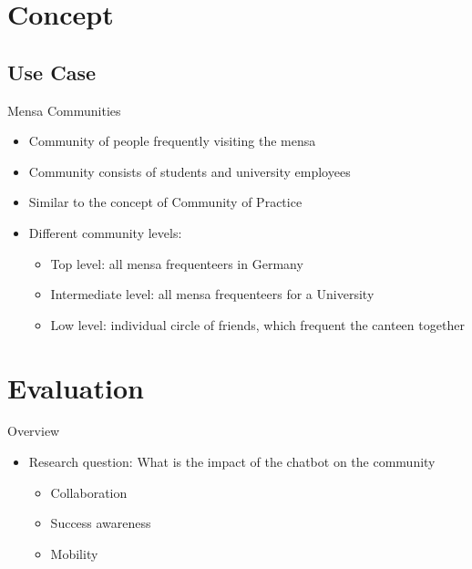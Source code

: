 \section{Concept}
\subsection{Use Case}
\begin{frame}{Mensa Communities}
  \begin{itemize}
    \item Community of people frequently visiting the mensa
    \item Community consists of students and university employees
    \item Similar to the concept of Community of Practice %
    \item Different community levels:
          \begin{itemize}
            \item Top level: all mensa frequenteers in Germany
            \item Intermediate level: all mensa frequenteers for a University
            \item Low level: individual circle of friends, which frequent the canteen together %
          \end{itemize}
  \end{itemize}
\end{frame}



\section{Evaluation}

\begin{frame}{Overview}
  \begin{itemize}
    \item Research question: What is the impact of the chatbot on the community
          \begin{itemize}
            \item Collaboration
            \item Success awareness
            \item Mobility
          \end{itemize}
  \end{itemize}
\end{frame}

